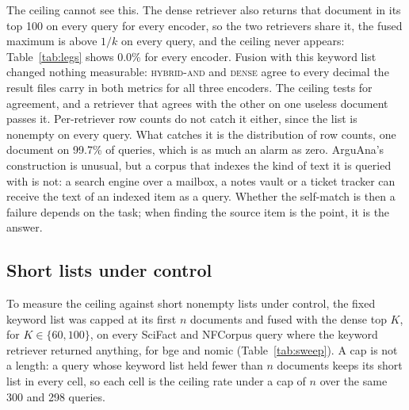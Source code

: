 \documentclass[11pt]{article}
\begin{document}
The ceiling cannot see this. The dense retriever also returns that document in its top 100 on every query for every encoder, so the two retrievers share it, the fused maximum is above $1/k$ on every query, and the ceiling never appears: Table~\ref{tab:legs} shows 0.0\% for every encoder. Fusion with this keyword list changed nothing measurable: \textsc{hybrid-and} and \textsc{dense} agree to every decimal the result files carry in both metrics for all three encoders. The ceiling tests for agreement, and a retriever that agrees with the other on one useless document passes it. Per-retriever row counts do not catch it either, since the list is nonempty on every query. What catches it is the distribution of row counts, one document on 99.7\% of queries, which is as much an alarm as zero. ArguAna's construction is unusual, but a corpus that indexes the kind of text it is queried with is not: a search engine over a mailbox, a notes vault or a ticket tracker can receive the text of an indexed item as a query. Whether the self-match is then a failure depends on the task; when finding the source item is the point, it is the answer.

\subsection{Short lists under control}
\label{sec:sweep}

To measure the ceiling against short nonempty lists under control, the fixed keyword list was capped at its first $n$ documents and fused with the dense top $K$, for $K \in \{60, 100\}$, on every SciFact and NFCorpus query where the keyword retriever returned anything, for bge and nomic (Table~\ref{tab:sweep}). A cap is not a length: a query whose keyword list held fewer than $n$ documents keeps its short list in every cell, so each cell is the ceiling rate under a cap of $n$ over the same 300 and 298 queries.
\end{document}
